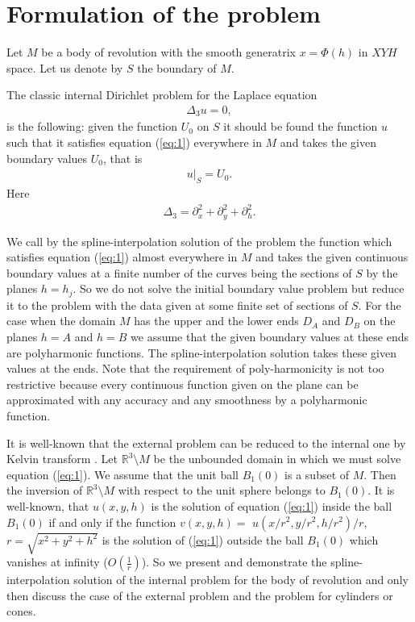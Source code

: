 \documentclass{amsart}
\begin{document}
\section{Formulation of the problem}

Let $M$ be a body of revolution with the smooth generatrix
$x=\Phi(h)$ in $XYH$ space.  Let us denote by $S$ the boundary of
$M$.

The classic internal Dirichlet problem for the Laplace equation
\begin{eqnarray}
\Delta_3 u=0,\label{eq:1}
\end{eqnarray}
is the following: given the function $U_0$ on $S$ it should be found
the function $u$ such that it satisfies equation (\ref{eq:1})
everywhere in $M$ and takes the given boundary values $U_0$, that is
\begin{eqnarray}
u|_{S}=U_0.\nonumber
\end{eqnarray}
Here
\begin{eqnarray}
\Delta_3=\partial^2_x+\partial^2_y+\partial^2_h.\nonumber
\end{eqnarray}

We call by the spline-interpolation solution of the problem the
function which satisfies equation (\ref{eq:1}) almost everywhere in
$M$ and takes the given continuous boundary values at a finite
number of the curves being the sections of $S$ by the planes
$h=h_j$. So we do not solve the initial boundary value problem but
reduce it to the problem with the data given at some finite set of
sections of $S$. For the case when the domain $M$ has the upper and
the lower ends $D_A$ and $D_B$ on the planes $h=A$ and $h=B$ we
assume that the given boundary values at these ends are polyharmonic
functions. The spline-interpolation solution takes these given
values at the ends. Note that the requirement of poly-harmonicity is
not too restrictive because every continuous function given on the
plane can be approximated with any accuracy and any smoothness by a
polyharmonic function.



It is well-known \cite{Vlad} that the external problem  can be
reduced to the internal one  by Kelvin transform \cite{Kel}. Let
$\mathbb{R}^3\setminus M$ be the unbounded domain in which we must
solve equation (\ref{eq:1}). We assume that the unit ball $B_1(0)$
is a subset of $M$. Then the inversion of $\mathbb{R}^3\setminus M$
with respect to the unit sphere belongs to $B_1(0)$.  It is
well-known, that $u(x, y, h)$ is the solution of equation
(\ref{eq:1}) inside the  ball $B_1(0)$ if and only if the function
$v(x,y,h)=$ $u(x/r^2, y/r^2, h/r^2)/r$, $r=\sqrt{x^2+y^2+h^2}$ is
the solution of (\ref{eq:1}) outside the ball $B_1(0)$ which
vanishes at infinity ($O(\frac{1}{r})$). So we present and
demonstrate the spline-interpolation solution of the internal
problem for the body of revolution and only then discuss the case of
the external problem and the problem for cylinders or cones.
\end{document}
